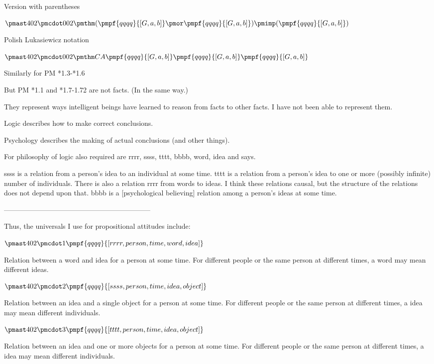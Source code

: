 \documentclass[12pt]{article}
\begin{document}
 

Version with parentheses

$\pmast 402 \pmcdot 002 \pmthm  (  \pmpf {qqqq}{[G,a,b]} \pmor \pmpf{qqqq}{[G,a,b]}  ) \pmimp (  \pmpf{qqqq}{[G,a,b]}     )$


Polish Lukasiewicz notation

$\pmast 402 \pmcdot 002 \pmthm  C    A   \pmpf   {qqqq}{[G,a,b]}   \pmpf{qqqq}{[G,a,b]}    \pmpf{qqqq}{[G,a,b]}      $


Similarly for PM *1.3-*1.6

But PM *1.1 and *1.7-1.72 are not facts. (In the same way.)

They represent ways intelligent beings have learned to
reason from facts to other facts. I have not been able to represent them.

Logic describes how to make correct conclusions.

Psychology describes the making of actual conclusions (and other things).

For philosophy of logic also required are rrrr, ssss, tttt, bbbb, word, idea and says.

ssss is a relation from a person’s idea to an individual at some time. tttt is a relation from a person’s idea to one or more (possibly infinite) number of individuals. There is also a relation rrrr from words to ideas. I think these relations causal, but the structure of the relations does not depend upon that. bbbb is a [psychological believing] relation among a person’s ideas at some time.

---------------------------------------------------------------

Thus, the universals I use for propositional attitudes include:

$\pmast 402 \pmcdot 1 \pmpf{qqqq}{[rrrr, person, time, word, idea]}$

Relation between a word and idea for a person at some time.
For different people or the same person at different times, a word may mean different ideas.

$\pmast 402 \pmcdot 2 \pmpf{qqqq}{[ssss, person, time, idea, object]}$

Relation between an idea and a single object for a person at some time.
For different people or the same person at different times, a idea may mean different individuals.

$\pmast 402 \pmcdot 3 \pmpf{qqqq}{[tttt, person, time, idea, object]}$

Relation between an idea and one or more objects for a person at some time.
For different people or the same person at different times, a idea may mean different individuals.
\end{document}
